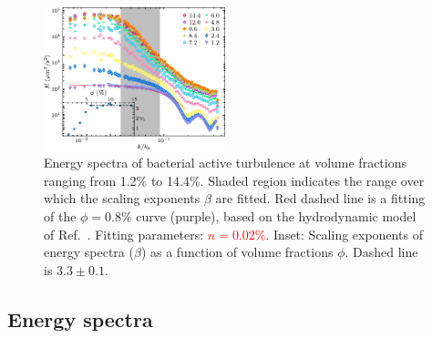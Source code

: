 \documentclass[twocolumn,aps,prx,amsmath,amssymb,longbibliography]{revtex4-2}
\begin{document}
\begin{figure}[!]
\begin{center}\includegraphics[width=0.47\textwidth]{Figures/energy-spectra/v4.pdf}
\caption[Concentration dependence of energy spectra.]
{
Energy spectra of bacterial active turbulence at volume fractions ranging from 1.2\% to 14.4\%. Shaded region indicates the range over which the scaling exponents $\beta$ are fitted. Red dashed line is a fitting of the $\phi=0.8\%$ curve (purple), based on the hydrodynamic model of Ref.~\cite{Bardfalvy2019}. Fitting parameters: \textcolor{red}{$n=0.02\%$}.
Inset: Scaling exponents of energy spectra ($\beta$) as a function of volume fractions $\phi$. Dashed line is $3.3 \pm 0.1$.
}
\label{fig:energy-spectra}
\end{center}
\end{figure}

\subsection{Energy spectra}
\end{document}
